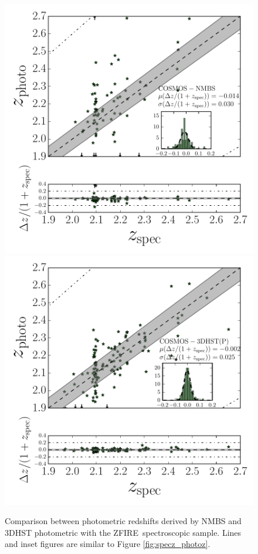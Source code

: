 \documentclass[iop]{emulateapj}
\begin{document}
\begin{figure}
\includegraphics[trim = 15 0 5 5, clip, scale=0.62]{figures/specz_vs_photo_z_NMBS.pdf}
\includegraphics[trim = 15 0 5 5, clip, scale=0.62]{figures/specz_vs_photo_z_3DHST_photo.pdf}
\caption{ Comparison between photometric redshifts derived by NMBS and 3DHST photometric \citep{Skelton2014} with the ZFIRE\ spectroscopic sample. 
Lines and inset figures are similar to Figure \ref{fig:specz_photoz}. }
\label{fig:photo_z_comp}
\end{figure}
\end{document}

